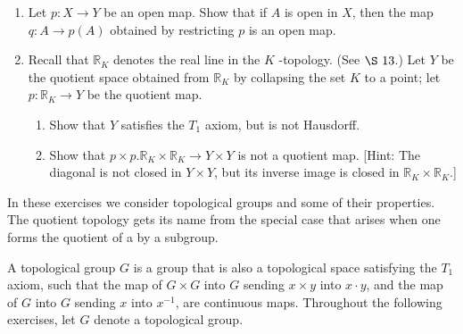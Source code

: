 \begin{enumerate}[itemsep=0.4em, parsep=0pt, topsep=0pt, partopsep=0pt, leftmargin=*, label=\arabic*., ref=\arabic*]
\begin{enumerate}[itemsep=0.2em, parsep=0pt, topsep=0pt, partopsep=0pt, leftmargin=*, label=(\alph*), align=left]
  \item Repeat (a) for the equivalence relation \[ x_{0} \times {y}_{0} \sim {x}_{1} \times {y}_{1}\;\text{ if }x_0^{2} + y_0^{2} = x_1^{2} + y_1^{2}. \]
  \end{enumerate}
\item Let \(p : X \rightarrow Y\) be an open map. Show that if \(A\) is open in \(X\), then the map \(q : A \rightarrow p( A)\) obtained by restricting \(p\) is an open map.
\item Recall that \(\mathbb{R}_{K}\) denotes the real line in the \(K\) -topology. (See \(\S\ {13}\).) Let \(Y\) be the quotient space obtained from \(\mathbb{R}_{K}\) by collapsing the set \(K\) to a point; let \(p : \mathbb{R}_{K} \rightarrow Y\) be the quotient map.
  \begin{enumerate}[itemsep=0.2em, parsep=0pt, topsep=0pt, partopsep=0pt, leftmargin=*, label=(\alph*), align=left]
  \item Show that \(Y\) satisfies the \(T_{1}\) axiom, but is not Hausdorff.
  \item Show that \(p \times p.\mathbb{R}_{K} \times {\mathbb{R}}_{K} \rightarrow Y \times Y\) is not a quotient map. [Hint: The diagonal is not closed in \(Y \times Y\), but its inverse image is closed in \(\mathbb{R}_{K} \times {\mathbb{R}}_{K}\).]
  \end{enumerate}
\end{enumerate}


In these exercises we consider topological groups and some of their properties. The quotient topology gets its name from the special case that arises when one forms the quotient of a  by a subgroup.

A topological group \(G\) is a group that is also a topological space satisfying the \(T_{1}\) axiom, such that the map of \(G \times G\) into \(G\) sending \(x \times y\) into \(x \cdot y\), and the map of \(G\) into \(G\) sending \(x\) into \(x^{-1}\), are continuous maps. Throughout the following exercises, let \(G\) denote a topological group.

